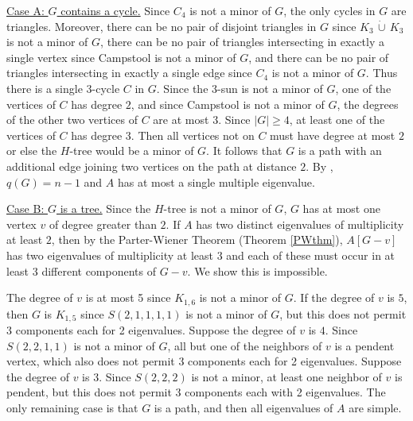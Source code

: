 \documentclass[11pt]{article}
\theoremstyle{definition}
\theoremstyle{definition}
\theoremstyle{definition}
\newcommand{\dcup}{\,\dot{\cup}\,}
\begin{document}
\underline{Case A:  $G$ contains a cycle.}  Since $C_4$ is not a minor of $G$, the only cycles in $G$ are triangles.  Moreover, there can be no pair of disjoint triangles in $G$ since  $K_3 \dcup K_3$ is not a minor of $G$, there can be no pair of  triangles intersecting in exactly a single vertex since Campstool is not a minor of $G$, and there can be no pair of triangles intersecting in exactly a single edge since $C_4$ is not a minor of $G$.  Thus there is a single 3-cycle $C$ in $G$.   Since the $3$-sun is not a minor of $G$, one of the vertices  of $C$ has degree $2$, and since  Campstool is not a minor of $G$, the degrees of the other two vertices of $C$ are at most $3$.  Since $|G|\ge 4$, at least one of the  vertices of $C$ has degree 3.  
Then all vertices not on $C$ must have degree at most $2$ or else the $H$-tree would be a minor of $G$.  It follows that $G$ is a path with an additional edge joining two vertices on the path at distance $2$.  By \cite[Proposition~50 and Theorem~51]{genSAP}, $q(G) = n-1$ and $A$ has at most a single multiple eigenvalue.  %
\smallskip


\underline{Case B:  $G$ is a tree.}  Since the $H$-tree is not a minor of $G$, $G$ has at most one vertex $v$ of degree greater than $2$.   If $A$ has two distinct  eigenvalues of multiplicity at least $2$, then by the Parter-Wiener Theorem (Theorem \ref{PWthm}), $A[G-v]$ has two eigenvalues of multiplicity at least  $3$ and each of these must occur in at least 3 different components of $G-v$.  We show this is impossible.

The degree of $v$ is at most 5 since $K_{1,6}$ is not a minor of $G$.  If the degree of $v$ is $5$, then $G$ is  $K_{1,5}$ since $S(2, 1, 1, 1, 1)$ is not a minor of $G$, but this does not permit 3 components each for 2 eigenvalues.
Suppose the degree of $v$ is $4$.  Since $S(2,2,1,1)$ is not a minor of $G$, all but one of the neighbors of $v$ is a pendent vertex, which also does not permit 3 components each for 2 eigenvalues.
Suppose the degree of $v$ is 3.  Since $S(2,2,2)$ is not a minor, at least one neighbor of $v$ is pendent, but this does not permit 3 components each with 2 eigenvalues.
The only remaining case is that $G$ is a path, and then all eigenvalues of $A$ are simple.\smallskip
\end{document}
